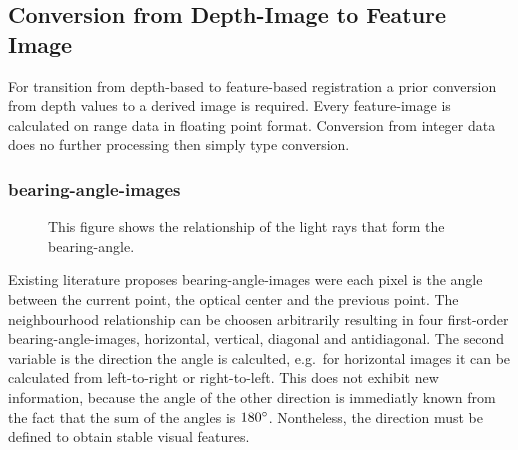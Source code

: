 \subsection{Conversion from Depth-Image to Feature Image}

For transition from depth-based to feature-based registration a prior conversion from depth values to a derived image is required.
Every feature-image is calculated on range data in floating point format.
Conversion from integer data does no further processing then simply type conversion.

\subsubsection{\Glspl{bearing-angle-image}}

\begin{figure}[H]
    \centering
    \caption[Schematic Representation of Bearing-Angles]{This figure shows the relationship of the light rays that form the \gls{bearing-angle}.}
\end{figure}

Existing literature\cite{Scaramuzza2007,Lin2017} proposes \Glspl{bearing-angle-image} were each pixel is the angle between the current point, the optical center and the previous point.
The neighbourhood relationship can be choosen arbitrarily resulting in four first-order \Glspl{bearing-angle-image}, horizontal, vertical, diagonal and antidiagonal.
The second variable is the direction the angle is calculted, e.g.~for horizontal images it can be calculated from left-to-right or right-to-left.
This does not exhibit new information, because the angle of the other direction is immediatly known from the fact that the sum of the angles is $180\degree$.
Nontheless, the direction must be defined to obtain stable visual features.

